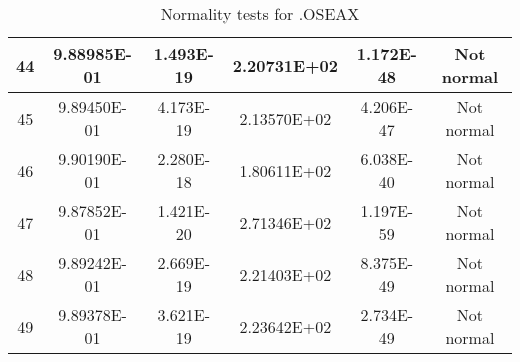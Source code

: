 \begin{table}[h]
\begin{tabular}{|c|c|c|c|c|c|}
		44 & 9.88985E-01 & 1.493E-19 & 2.20731E+02 & 1.172E-48 & Not normal\\\hline
		45 & 9.89450E-01 & 4.173E-19 & 2.13570E+02 & 4.206E-47 & Not normal\\\hline
		46 & 9.90190E-01 & 2.280E-18 & 1.80611E+02 & 6.038E-40 & Not normal\\\hline
		47 & 9.87852E-01 & 1.421E-20 & 2.71346E+02 & 1.197E-59 & Not normal\\\hline
		48 & 9.89242E-01 & 2.669E-19 & 2.21403E+02 & 8.375E-49 & Not normal\\\hline
		49 & 9.89378E-01 & 3.621E-19 & 2.23642E+02 & 2.734E-49 & Not normal\\\hline
	\end{tabular}
	\caption{Normality tests for .OSEAX}
	\label{tab:normality_tests_OSEAX}
\end{table}
